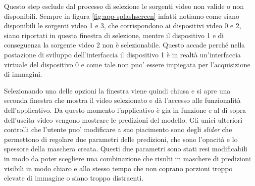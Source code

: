 Questo step esclude dal processo di selezione le sorgenti video
non valide o non disponibili.
Sempre in figura \ref{fig:app-splashscreen} infatti notiamo come
siano disponibili le sorgenti video 1 e 3, che corrispondono
ai dispositivi video 0 e 2, siano riportati in questa
finestra di selezione, mentre il dispositivo 1 e di conseguenza
la sorgente video 2 non è selezionabile.
Questo accade perché nella postazione di sviluppo dell'interfaccia
il dispositivo 1 è in realtà un'interfaccia virtuale del
dispositivo 0 e come tale non puo' essere impiegata per
l'acquisizione di immagini.

Selezionando una delle opzioni la finestra viene quindi chiusa
e si apre una seconda finestra che mostra il video selezionato
e dà l'accesso alle funzionalità dell'applicativo.
Da questo momento l'applicativo è gia in funzione
e al di sopra dell'uscita video vengono mostrare le predizioni
del modello.
Gli unici ulteriori controlli che l'utente puo' modificare a
suo piacimento sono degli {\it slider} che permettono di
regolare due parametri delle predizioni, che sono
l'opacità e lo spessore della maschera creata.
Questi due parametri sono stati resi modificabili in modo
da poter scegliere una combinazione che risulti
in maschere di predizioni visibili in modo chiaro e allo
stesso tempo che non coprano porzioni troppo elevate di
immagine o siano troppo distraenti.


